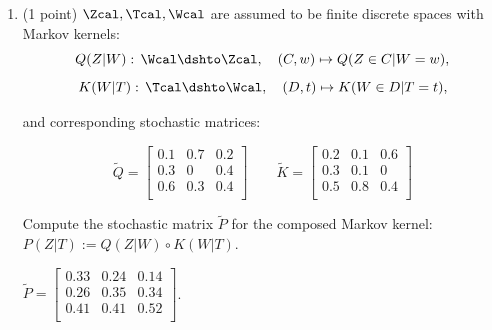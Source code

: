 \begin{enumerate}
	\begin{gradedsolution}
		\begin{align*}
			P(M=1, O=1, C=1)=3/4 \times 1/4 & =3/16 \\
			P(M=0, O=1, C=1)=1/2 \times 1/4 & =2/16 \\
			P(M=1|O=1,C=1)                  & =3/5  \\
			P(M=1, O=0, C=1)=2/4 \times 1/4 & =2/16 \\
			P(M=0, O=0, C=1)=1/4 \times 1/4 & =1/16 \\
			P(M=1|O=0,C=1)                  & =2/3  \\
		\end{align*}
	\end{gradedsolution}

	\item (1 point) $\Zcal, \Tcal, \Wcal$ are assumed to be finite discrete spaces with Markov kernels:\\

	\[Q(Z|W):\, \Wcal \dshto \Zcal,\quad (C,w) \mapsto Q(Z \in C|W=w),  \]
	\[K(W|T):\, \Tcal \dshto \Wcal,\quad (D,t) \mapsto K(W \in D|T=t),  \]

	and corresponding stochastic matrices:

	\[\tilde Q =
		\begin{bmatrix}
			0.1 & 0.7 & 0.2 \\
			0.3 & 0   & 0.4 \\
			0.6 & 0.3 & 0.4 \\
		\end{bmatrix}
		\qquad
		\tilde K =
		\begin{bmatrix}
			0.2 & 0.1 & 0.6 \\
			0.3 & 0.1 & 0   \\
			0.5 & 0.8 & 0.4 \\
		\end{bmatrix}\]


	Compute the stochastic matrix $\tilde P$ for the composed  Markov kernel: $P(Z|T):=Q(Z|W) \circ K(W|T)$.

	\begin{gradedsolution}
		$\tilde P = \begin{bmatrix}
				0.33 & 0.24 & 0.14 \\
				0.26 & 0.35 & 0.34 \\
				0.41 & 0.41 & 0.52 \\
			\end{bmatrix}$.
	\end{gradedsolution}


\end{enumerate}
